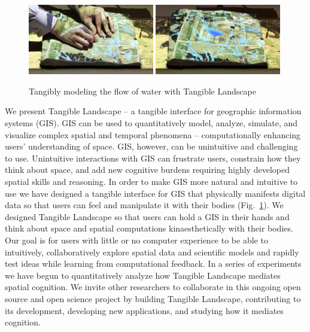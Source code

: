 \documentclass[prodmode,acmtochi]{acmsmall} %
\begin{document}
\begin{figure}[h!]
\begin{center}
		\includegraphics[width=0.49\textwidth]{images/tl_sequence_2.jpg}
		\includegraphics[width=0.49\textwidth]{images/tl_sequence_3.jpg}
	\caption{Tangibly modeling the flow of water with Tangible Landscape}
	\label{fig:tl_flow}
\end{center}
\end{figure}

We present Tangible Landscape -- 
a tangible interface for geographic information systems (GIS). 
%
GIS can be used to quantitatively model, analyze, simulate, and visualize 
complex spatial and temporal phenomena 
-- computationally enhancing users' understanding of space. 
%
GIS, however, can be unintuitive and challenging to use. 
%
Unintuitive interactions with GIS can 
frustrate users,
constrain how they think about space,
and add new cognitive burdens
requiring highly developed spatial skills and reasoning. 
%
In order to make GIS more natural and intuitive to use
we have designed a tangible interface for GIS
that physically manifests digital data 
so that users can feel and manipulate it with their bodies (Fig.~\ref{fig:tl_flow}). 
%
We designed Tangible Landscape
so that users can hold a GIS in their hands
and think about 
space and spatial computations 
kinaesthetically with their bodies.
%
Our goal is for users with little or no computer experience 
to be able to intuitively, collaboratively explore spatial data and scientific models and 
rapidly test ideas while learning from computational feedback. 
%
In a series of experiments we have begun to
quantitatively analyze how 
Tangible Landscape mediates spatial cognition. 
%
We invite other researchers to collaborate 
in this ongoing open source and open science project 
by building Tangible Landscape,
contributing to its development,
developing new applications, 
and studying how it mediates cognition. 
\end{document}
